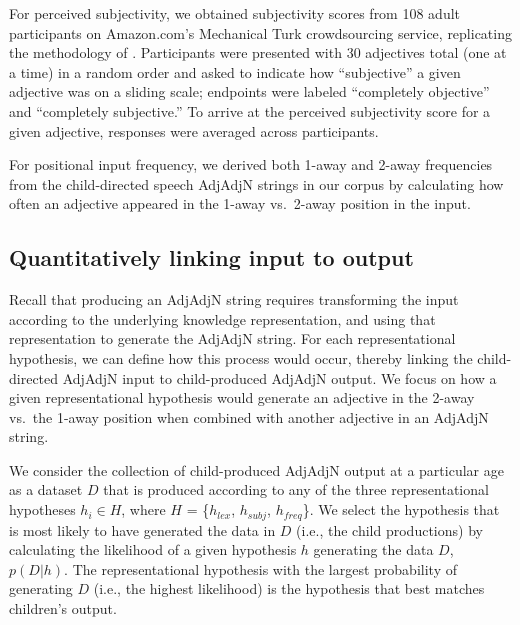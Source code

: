 \documentclass[10pt]{article}
\newcommand{\lsp}[1]{\textcolor{violet}{[lsp: #1]}}
\begin{document}
For perceived subjectivity, we obtained subjectivity scores from 108 adult participants on Amazon.com's Mechanical Turk crowdsourcing service, replicating the methodology of \cite{scontras2017subjectivity}. Participants were presented with 30 adjectives total (one at a time) in a random order and asked to indicate how ``subjective'' a given adjective was on a sliding scale; endpoints were labeled ``completely objective'' and ``completely subjective.'' To arrive at the perceived subjectivity score for a given adjective, responses were averaged across participants.
 
For positional input frequency, we derived both 1-away and 2-away frequencies from the child-directed speech AdjAdjN strings in our corpus by calculating how often an adjective appeared in the 1-away vs.~2-away position in the input.

\subsection{Quantitatively linking input to output}

Recall that producing an AdjAdjN string requires transforming the input according to the underlying knowledge representation, and using that representation to generate the AdjAdjN string. For each representational hypothesis, we can define how this process would occur, thereby linking the child-directed AdjAdjN input to child-produced AdjAdjN output.
We focus on how %
a given representational hypothesis would generate an adjective in the 2-away  vs.~the 1-away position when combined with another adjective in an AdjAdjN string.

We consider the collection of child-produced AdjAdjN output at a particular age as a dataset $D$ that is produced according to any of the three representational hypotheses $h_i \in H$, where $H$ = \{$h_{lex}$, $h_{subj}$, $h_{freq}$\}. We select the hypothesis that is most likely to have generated the data in $D$ (i.e., the child productions) by calculating the likelihood of a given hypothesis $h$ generating the data $D$, $p(D | h)$. The representational hypothesis with the largest probability of generating $D$ (i.e., the highest likelihood) is the hypothesis that best matches children's output. 
\end{document}
